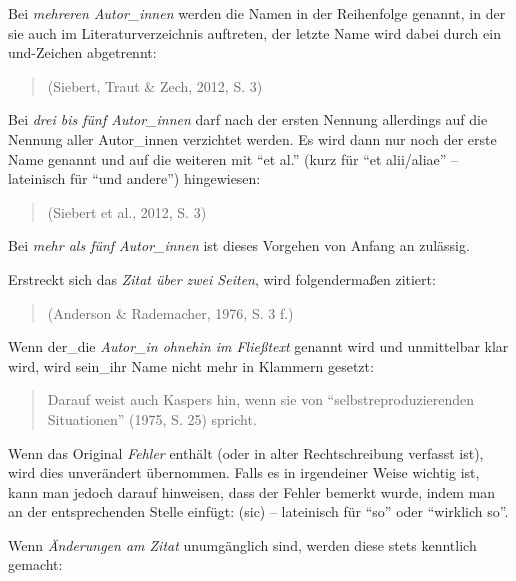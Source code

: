 \documentclass[ngerman,bibliography=totoc,oneside,12pt,a4paper]{scrbook}
\begin{document}
Bei \emph{mehreren Autor\_innen} werden die Namen in der Reihenfolge
genannt, in der sie auch im Literaturverzeichnis auftreten, der letzte
Name wird dabei durch ein und-Zeichen abgetrennt:

\begin{quote}
(Siebert, Traut \& Zech, 2012, S. 3)
\end{quote}

Bei \emph{drei bis fünf Autor\_innen} darf nach der ersten Nennung
allerdings auf die Nennung aller Autor\_innen verzichtet werden. Es wird
dann nur noch der erste Name genannt und auf die weiteren mit
\enquote{et al.} (kurz für \enquote{et alii/aliae} -- lateinisch für
\enquote{und andere}) hingewiesen:

\begin{quote}
(Siebert et al., 2012, S. 3)
\end{quote}

Bei \emph{mehr als fünf Autor\_innen} ist dieses Vorgehen von Anfang an
zulässig.

Erstreckt sich das \emph{Zitat über zwei Seiten}, wird folgendermaßen
zitiert:

\begin{quote}
(Anderson \& Rademacher, 1976, S. 3 f.)
\end{quote}

Wenn der\_die \emph{Autor\_in ohnehin im Fließtext} genannt wird und
unmittelbar klar wird, wird sein\_ihr Name nicht mehr in Klammern
gesetzt:

\begin{quote}
Darauf weist auch Kaspers hin, wenn sie von
\enquote{selbstreproduzierenden Situationen} (1975, S. 25) spricht.
\end{quote}

Wenn das Original \emph{Fehler} enthält (oder in alter Rechtschreibung
verfasst ist), wird dies unverändert übernommen. Falls es in irgendeiner
Weise wichtig ist, kann man jedoch darauf hinweisen, dass der Fehler
bemerkt wurde, indem man an der entsprechenden Stelle einfügt: (sic) --
lateinisch für \enquote{so} oder \enquote{wirklich so}.

Wenn \emph{Änderungen am Zitat} unumgänglich sind, werden diese stets
kenntlich gemacht:
\end{document}
